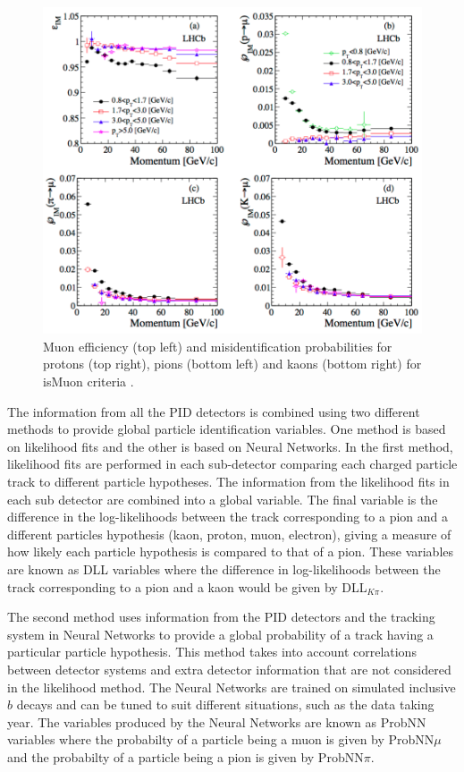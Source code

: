 \begin{figure}[htb] 
  \centering    
  \includegraphics[width=1.0\textwidth]{./Figs/LHC_LHCb/isMuon_eff.png}
  \caption{Muon efficiency (top left) and misidentification probabilities for protons (top right), pions (bottom left) and kaons (bottom right) for isMuon criteria \cite{Archilli:2013npa}. }
  \label{fig:isMuon_efficiency}
\end{figure}




The information from all the PID detectors is combined using two different methods to provide global particle identification variables. One method is based on likelihood fits and the other is based on Neural Networks. In the first method, likelihood fits are performed in each sub-detector comparing each charged particle track to different particle hypotheses. The information from the likelihood fits in each sub detector are combined into a global variable. The final variable is the difference in the log-likelihoods between the track corresponding to a pion and a different particles hypothesis (kaon, proton, muon, electron), giving a measure of how likely each particle hypothesis is compared to that of a pion. These variables are known as DLL variables where the difference in log-likelihoods between the track corresponding to a pion and a kaon would be given by DLL$_{K\pi}$.




The second method uses information from the PID detectors and the tracking system in Neural Networks to provide a global probability of a track having a particular particle hypothesis. This method takes into account correlations between detector systems and extra detector information that are not considered in the likelihood method. The Neural Networks are trained on simulated inclusive $b$ decays and can be tuned to suit different situations, such as the data taking year. The variables produced by the Neural Networks are known as ProbNN variables where the probabilty of a particle being a muon is given by ProbNN$\mu$ and the probabilty of a particle being a pion is given by ProbNN$\pi$.


